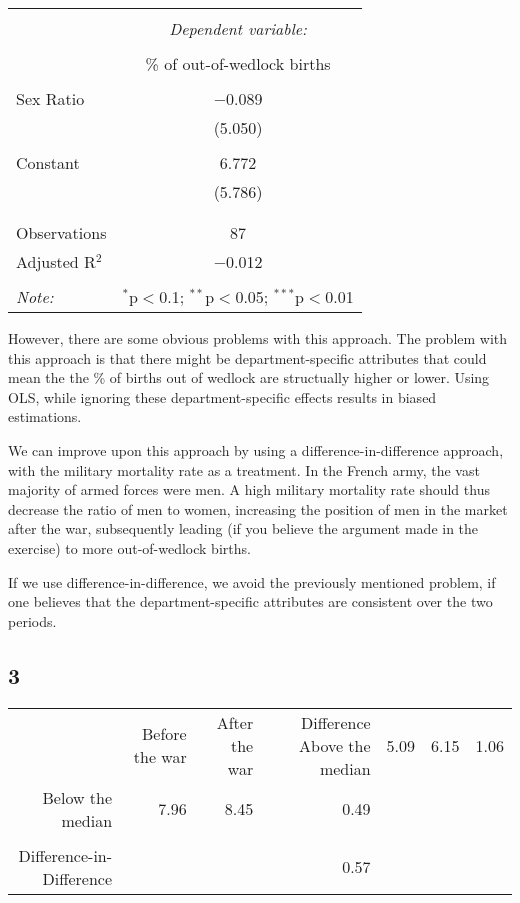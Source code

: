 \documentclass[
]{article}
\begin{document}
\begin{table}[!htbp] \centering 
  \caption{} 
  \label{} 
\begin{tabular}{@{\extracolsep{5pt}}lc} 
\\[-1.8ex]\hline 
\hline \\[-1.8ex] 
 & \multicolumn{1}{c}{\textit{Dependent variable:}} \\ 
\cline{2-2} 
\\[-1.8ex] & \% of out-of-wedlock births \\ 
\hline \\[-1.8ex] 
 Sex Ratio & $-$0.089 \\ 
  & (5.050) \\ 
  & \\ 
 Constant & 6.772 \\ 
  & (5.786) \\ 
  & \\ 
\hline \\[-1.8ex] 
Observations & 87 \\ 
Adjusted R$^{2}$ & $-$0.012 \\ 
\hline 
\hline \\[-1.8ex] 
\textit{Note:}  & \multicolumn{1}{r}{$^{*}$p$<$0.1; $^{**}$p$<$0.05; $^{***}$p$<$0.01} \\ 
\end{tabular} 
\end{table}

However, there are some obvious problems with this approach. The problem
with this approach is that there might be department-specific attributes
that could mean the the \% of births out of wedlock are structually
higher or lower. Using OLS, while ignoring these department-specific
effects results in biased estimations.

We can improve upon this approach by using a difference-in-difference
approach, with the military mortality rate as a treatment. In the French
army, the vast majority of armed forces were men. A high military
mortality rate should thus decrease the ratio of men to women,
increasing the position of men in the market after the war, subsequently
leading (if you believe the argument made in the exercise) to more
out-of-wedlock births.

If we use difference-in-difference, we avoid the previously mentioned
problem, if one believes that the department-specific attributes are
consistent over the two periods.

\hypertarget{section-2}{%
\subsection{3}\label{section-2}}

\begin{table}[]
\begin{tabular}{rrrr}
                  & Before the war & After the war & Difference
 Above the median&  5.09 & 6.15 & 1.06    \\
 Below the median&  7.96 & 8.45 & 0.49   \\
 \vline \\
 Difference-in-Difference & & & 0.57 
\end{tabular}
\end{table}
\end{document}
